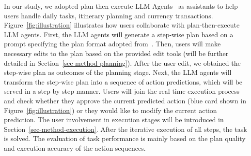 In our study, we adopted plan-then-execute LLM Agents~\cite{wang2023plan} as assistants to help users handle daily tasks, \eg itinerary planning and currency transactions. Figure~\ref{fig:illustration} illustrates how users collaborate with plan-then-execute LLM agents. 
First, the LLM agents will generate a step-wise plan based on a prompt specifying the plan format adopted from~\cite{huang2024planning}. 
Then, users will make necessary edits to the plan based on the provided edit tools (will be further detailed in Section~\ref{sec-method-planning}). 
After the user edit, we obtained the step-wise plan as outcomes of the planning stage. 
Next, the LLM agents will transform the step-wise plan into a sequence of action predictions, which will be served in a step-by-step manner. 
Users will join the real-time execution process and check whether they approve the current predicted action (\ie blue card shown in Figure~\ref{fig:illustration}) or they would like to modify the current action prediction. The user involvement in execution stages will be introduced in Section~\ref{sec-method-execution}. 
After the iterative execution of all steps, the task is solved. {The evaluation of task performance is mainly based on the plan quality and execution accuracy of the action sequences.}

